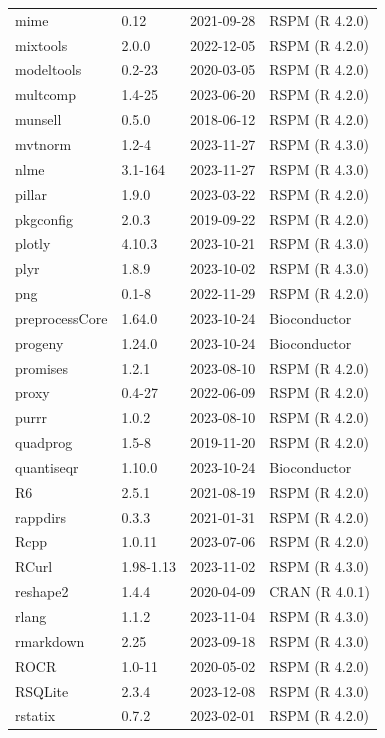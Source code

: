 \documentclass[]{article}
\begin{document}
\begin{longtable}[t]{llll}
\addlinespace
mime & 0.12 & 2021-09-28 & RSPM (R 4.2.0)\\
mixtools & 2.0.0 & 2022-12-05 & RSPM (R 4.2.0)\\
modeltools & 0.2-23 & 2020-03-05 & RSPM (R 4.2.0)\\
multcomp & 1.4-25 & 2023-06-20 & RSPM (R 4.2.0)\\
munsell & 0.5.0 & 2018-06-12 & RSPM (R 4.2.0)\\
\addlinespace
mvtnorm & 1.2-4 & 2023-11-27 & RSPM (R 4.3.0)\\
nlme & 3.1-164 & 2023-11-27 & RSPM (R 4.3.0)\\
pillar & 1.9.0 & 2023-03-22 & RSPM (R 4.2.0)\\
pkgconfig & 2.0.3 & 2019-09-22 & RSPM (R 4.2.0)\\
plotly & 4.10.3 & 2023-10-21 & RSPM (R 4.3.0)\\
\addlinespace
plyr & 1.8.9 & 2023-10-02 & RSPM (R 4.3.0)\\
png & 0.1-8 & 2022-11-29 & RSPM (R 4.2.0)\\
preprocessCore & 1.64.0 & 2023-10-24 & Bioconductor\\
progeny & 1.24.0 & 2023-10-24 & Bioconductor\\
promises & 1.2.1 & 2023-08-10 & RSPM (R 4.2.0)\\
\addlinespace
proxy & 0.4-27 & 2022-06-09 & RSPM (R 4.2.0)\\
purrr & 1.0.2 & 2023-08-10 & RSPM (R 4.2.0)\\
quadprog & 1.5-8 & 2019-11-20 & RSPM (R 4.2.0)\\
quantiseqr & 1.10.0 & 2023-10-24 & Bioconductor\\
R6 & 2.5.1 & 2021-08-19 & RSPM (R 4.2.0)\\
\addlinespace
rappdirs & 0.3.3 & 2021-01-31 & RSPM (R 4.2.0)\\
Rcpp & 1.0.11 & 2023-07-06 & RSPM (R 4.2.0)\\
RCurl & 1.98-1.13 & 2023-11-02 & RSPM (R 4.3.0)\\
reshape2 & 1.4.4 & 2020-04-09 & CRAN (R 4.0.1)\\
rlang & 1.1.2 & 2023-11-04 & RSPM (R 4.3.0)\\
\addlinespace
rmarkdown & 2.25 & 2023-09-18 & RSPM (R 4.3.0)\\
ROCR & 1.0-11 & 2020-05-02 & RSPM (R 4.2.0)\\
RSQLite & 2.3.4 & 2023-12-08 & RSPM (R 4.3.0)\\
rstatix & 0.7.2 & 2023-02-01 & RSPM (R 4.2.0)\\

\end{longtable}
\end{document}
